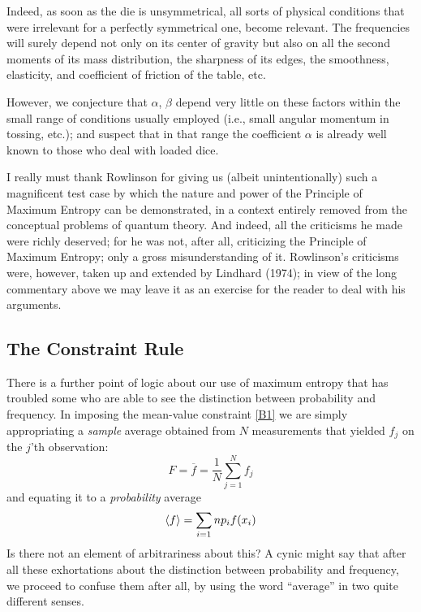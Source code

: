 {Indeed, as soon as the die is unsymmetrical, all sorts of physical conditions that were irrelevant for a perfectly symmetrical one, become relevant.
The frequencies will surely depend not only on its center of gravity but also on all the second moments of its mass distribution, the sharpness of its edges, the smoothness, elasticity, and coefficient of friction of the table, etc.

However, we conjecture that $\alpha$, $\beta$ depend very little on these factors within the small range of conditions usually employed (i.e., small angular momentum in tossing, etc.); and suspect that in that range the coefficient $\alpha$ is already well known to those who deal with loaded dice.

I really must thank Rowlinson for giving us (albeit unintentionally) such a magnificent test case by which the nature and power of the Principle of Maximum Entropy can be demonstrated, in a context entirely removed from the conceptual problems of quantum theory.
And indeed, all the criticisms he made were richly deserved; for he was not, after all, criticizing the Principle of Maximum Entropy; only a gross misunderstanding of it.
Rowlinson's criticisms were, however, taken up and extended by Lindhard (\cite{lindhard}{1974}); in view of the long commentary above we may leave it as an exercise for the reader to deal with his arguments.


\subsection{The Constraint Rule}
There is a further point of logic about our use of maximum entropy that has troubled some who are able to see the distinction between probability and frequency.
In imposing the mean-value constraint \eqref{B1} we are simply appropriating a \emph{sample} average obtained from $N$ measurements that yielded $f_j$ on the $j$'th observation:
\begin{equation}
	\label{B70}
	F = \overline{f} = \frac{1}{N} \sum_{j=1}^{N} f_j
\end{equation}
and equating it to a \emph{probability} average
\begin{equation}
	\label{B71}
	\langle f\rangle = \sum_{i=1}{n} p_i f(x_i)
\end{equation}
Is there not an element of arbitrariness about this?
A cynic might say that after all these exhortations about the distinction between probability and frequency, we proceed to confuse them after all, by using the word ``average'' in two quite different senses.

}
